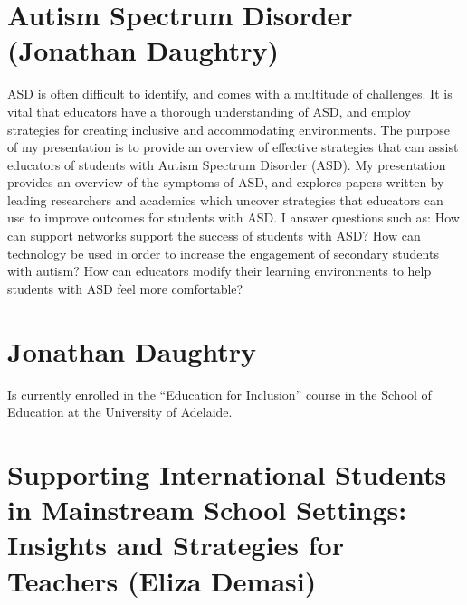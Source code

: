 \documentclass[twoside,12pt,a4paper,notitlepage]{memoir}
\begin{document}
\pagebreak
\section*{Autism Spectrum Disorder (Jonathan Daughtry)}
\label{aut:daughtry}

ASD is often difficult to identify, and comes with a multitude of challenges. It is vital that educators have a thorough understanding of ASD, and employ strategies for creating inclusive and accommodating environments. The purpose of my presentation is to provide an overview of effective strategies that can assist educators of students with Autism Spectrum Disorder (ASD).
My presentation provides an overview of the symptoms of ASD, and explores papers written by leading researchers and academics which uncover strategies that educators can use to improve outcomes for students with ASD. I answer questions such as: How can support networks support the success of students with ASD? How can technology be used in order to increase the engagement of secondary students with autism? How can educators modify their learning environments to help students with ASD feel more comfortable?


\section*{Jonathan Daughtry}

Is currently enrolled in the ``Education for Inclusion'' course in the School of Education at the University of Adelaide.



\pagebreak
\section*{Supporting International Students in Mainstream School Settings: Insights and Strategies for Teachers (Eliza Demasi)}
\label{aut:demasi}
\end{document}
